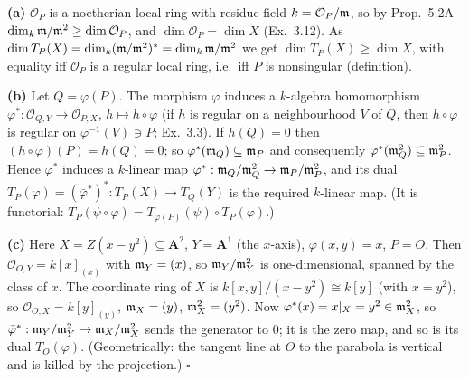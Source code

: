 \documentclass[11pt]{article}
\begin{document}
\pf
\textbf{(a)} $\mathcal O_P$ is a noetherian local ring with residue field $k=\mathcal O_P/\mathfrak m$, so by Prop.~5.2A $\dim_k\mathfrak m/\mathfrak m^2\ge\dim\mathcal O_P$, and $\dim\mathcal O_P=\dim X$ (Ex.~3.12). As $\dim T_P(X)=\dim_k(\mathfrak m/\mathfrak m^2)^*=\dim_k\mathfrak m/\mathfrak m^2$ we get $\dim T_P(X)\ge\dim X$, with equality iff $\mathcal O_P$ is a regular local ring, i.e.\ iff $P$ is nonsingular (definition).

\textbf{(b)} Let $Q=\varphi(P)$. The morphism $\varphi$ induces a $k$-algebra homomorphism $\varphi^*:\mathcal O_{Q,Y}\to\mathcal O_{P,X}$, $h\mapsto h\circ\varphi$ (if $h$ is regular on a neighbourhood $V$ of $Q$, then $h\circ\varphi$ is regular on $\varphi^{-1}(V)\ni P$; Ex.~3.3). If $h(Q)=0$ then $(h\circ\varphi)(P)=h(Q)=0$; so $\varphi^*(\mathfrak m_Q)\subseteq\mathfrak m_P$ and consequently $\varphi^*(\mathfrak m_Q^2)\subseteq\mathfrak m_P^2$. Hence $\varphi^*$ induces a $k$-linear map $\bar\varphi^*:\mathfrak m_Q/\mathfrak m_Q^2\to\mathfrak m_P/\mathfrak m_P^2$, and its dual $T_P(\varphi)=(\bar\varphi^*)^*:T_P(X)\to T_Q(Y)$ is the required $k$-linear map. (It is functorial: $T_P(\psi\circ\varphi)=T_{\varphi(P)}(\psi)\circ T_P(\varphi)$.)

\textbf{(c)} Here $X=Z(x-y^2)\subseteq\mathbf A^2$, $Y=\mathbf A^1$ (the $x$-axis), $\varphi(x,y)=x$, $P=O$. Then $\mathcal O_{O,Y}=k[x]_{(x)}$ with $\mathfrak m_Y=(x)$, so $\mathfrak m_Y/\mathfrak m_Y^2$ is one-dimensional, spanned by the class of $x$. The coordinate ring of $X$ is $k[x,y]/(x-y^2)\cong k[y]$ (with $x=y^2$), so $\mathcal O_{O,X}=k[y]_{(y)}$, $\mathfrak m_X=(y)$, $\mathfrak m_X^2=(y^2)$. Now $\varphi^*(x)=x|_X=y^2\in\mathfrak m_X^2$, so $\bar\varphi^*:\mathfrak m_Y/\mathfrak m_Y^2\to\mathfrak m_X/\mathfrak m_X^2$ sends the generator to $0$; it is the zero map, and so is its dual $T_O(\varphi)$. (Geometrically: the tangent line at $O$ to the parabola is vertical and is killed by the projection.) \hfill$\square$
\end{document}
